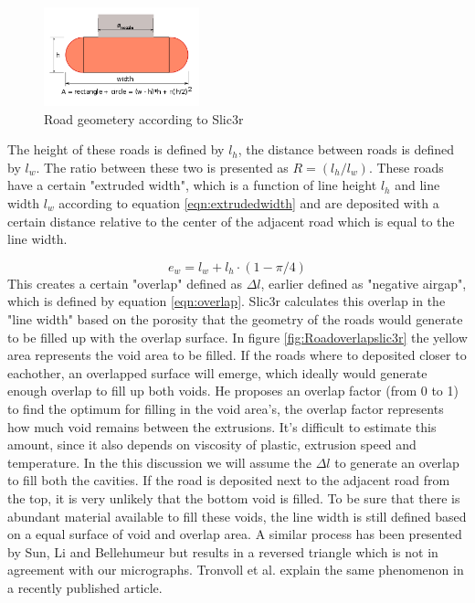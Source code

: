 \begin{figure}[H]
   \centering
    \includegraphics[width=0.40\textwidth]{chapter_2/figures/Slic3rshape.png}
    \caption{Road geometery according to Slic3r \cite{GaryHodgsonSlic3rMath}}
    \label{fig:Slic3rshape}
\end{figure}

The height of these roads is defined by $l_h$, the distance between roads is defined by $l_w$. The ratio between these two is presented as $R=(l_h/l_w)$.
These roads have a certain "extruded width", which is a function of line height $l_h$ and line width $l_w$ according to equation \ref{eqn:extrudedwidth} and are deposited with a certain distance relative to the center of the adjacent road which is equal to the line width. 

\begin{equation} \label{eqn:extrudedwidth}
e_w=l_w+l_h\cdot(1-\pi/4)
\end{equation}
This creates a certain "overlap" defined as $\Delta l$, earlier defined as "negative airgap", which is defined by equation \ref{eqn:overlap}. Slic3r calculates this overlap in the "line width" based on the porosity that the geometry of the roads would generate to be filled up with the overlap surface. In figure \ref{fig:Roadoverlapslic3r} the yellow area represents the void area to be filled. If the roads where to deposited closer to eachother, an overlapped surface will emerge, which ideally would generate enough overlap to fill up both voids. He proposes an overlap factor (from 0 to 1) to find the optimum for filling in the void area's, the overlap factor represents how much void remains between the extrusions. It's difficult to estimate this amount, since it also depends on viscosity of plastic, extrusion speed and temperature. In the this discussion we will assume the $\Delta l$ to generate an overlap to fill both the cavities. 
If the road is deposited next to the adjacent road from the top, it is very unlikely that the bottom void is filled. To be sure that there is abundant material available to fill these voids, the line width is still defined based on a equal surface of void and overlap area. A similar process has been presented by Sun, Li and Bellehumeur \cite{Li2002CompositeProperties} but results in a reversed triangle which is not in agreement with our micrographs. Tronvoll et al. \cite{TronvollTheApproach} explain the same phenomenon in a recently published article.


